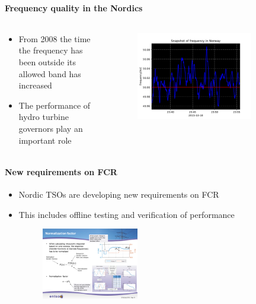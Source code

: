 \begin{frame}{\secname}
	\framesubtitle{Frequency quality in the Nordics}
	\begin{columns}
		\begin{column}{0.5\textwidth}
			\begin{itemize}
				\item From 2008 the time the frequency has been outside its allowed band has increased
				\item The performance of hydro turbine governors play an important role
			\end{itemize}
		\end{column}
		\begin{column}{0.5\textwidth}
			\begin{figure}
				\includegraphics[width=0.8\textwidth]{./pictures/frequency.pdf}
			\end{figure}
		\end{column}
	\end{columns}
\end{frame}
\begin{frame}{\secname}
	\framesubtitle{New requirements on FCR}
	\begin{itemize}
		\item Nordic TSOs are developing new requirements on FCR
		\item This includes offline testing and verification of performance
		\begin{figure}
				\includegraphics[width=0.4\textwidth]{./pictures/fcr}
		\end{figure}
	\end{itemize}
\end{frame}
